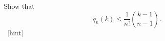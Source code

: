 \documentclass{book}
\begin{document}
\setcounter{project}{310}
\addtocounter{project}{-1}
\begin{activity}[]\label{activity-303}
\hypertarget{p-1591}{}%
Show that%
\begin{equation*}
q_n(k) \le \frac{1}{n!}\binom{k-1}{n-1}.
\end{equation*}
%
~\hfill{\tiny\hyperlink{a-310}{[hint]}\hypertarget{q-310}{}}\end{activity}
\end{document}
